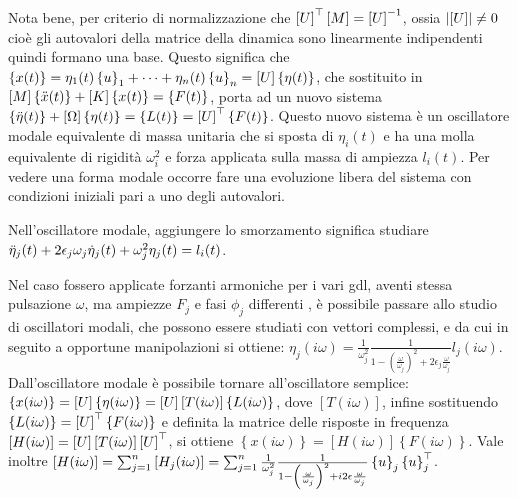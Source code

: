 Nota bene, per criterio di normalizzazione che \(\left[ U \right]^\top \left[M\right] = \left[ U \right]^{-1}\), ossia \(\left|\left[ U \right]\right| \neq 0\) cioè gli autovalori della matrice della dinamica sono linearmente indipendenti quindi formano una base.
Questo significa che \(\left\{ x(t) \right\} = \eta_1(t) \left\{ u \right\}_1 + \dots + \eta_n(t) \left\{ u \right\}_n = \left[ U \right] \left\{ \eta(t) \right\}\), che sostituito in \(\left[M\right] \left\{ \Ddot{x}(t) \right\} + \left[ K \right] \left\{ x(t) \right\} = \left\{ F(t) \right\}\), porta ad un nuovo sistema \(\left\{ \Ddot{\eta}(t) \right\} + \left[ \Omega \right] \left\{ \eta(t) \right\} = \left\{ L(t) \right\} = \left[ U \right]^\top \left\{ F(t) \right\} \).
Questo nuovo sistema è un oscillatore modale equivalente di massa unitaria che si sposta di \(\eta_i(t)\) e ha una molla equivalente di rigidità \(\omega_i^2\) e forza applicata sulla massa di ampiezza \(l_i(t)\).
Per vedere una forma modale occorre fare una evoluzione libera del sistema con condizioni iniziali pari a uno degli autovalori.

Nell'oscillatore modale, aggiungere lo smorzamento significa studiare \( \Ddot{\eta}_j(t) + 2\epsilon_j\omega_j \dot{\eta}_j(t) + \omega^2_j \eta_j(t) = l_i(t) \).

Nel caso fossero applicate forzanti armoniche per i vari gdl, aventi stessa pulsazione \(\omega\), ma ampiezze \(F_j\) e fasi \(\phi_j\) differenti , è possibile passare allo studio di oscillatori modali, che possono essere studiati con vettori complessi, e da cui in seguito a opportune manipolazioni  si ottiene: \(\eta_j(i\omega) = \frac{1}{\omega_j^2} \frac{1}{1-\left(\frac{\omega}{\omega_j}\right)^2 + 2\epsilon_j \frac{\omega}{\omega_j}} l_j(i\omega)\).
Dall'oscillatore modale è possibile tornare all'oscillatore semplice: \(\left\{ x(i\omega) \right\} = \left[ U \right] \left\{ \eta(i\omega) \right\} = \left[ U \right] \left[ T(i\omega) \right] \left\{ L(i\omega) \right\} \), dove \(\left[ T(i\omega) \right]\), infine sostituendo \(\left\{ L(i\omega) \right\} = \left[ U \right]^\top \left\{ F(i\omega) \right\}\) e definita la matrice delle risposte in frequenza \( \left[ H(i\omega) \right] = \left[ U \right] \left[ T(i\omega) \right] \left[ U \right]^\top \), si ottiene \( \left\{ x(i\omega) \right\} = \left[ H(i\omega) \right] \left\{ F(i\omega) \right\} \).
Vale inoltre \(\left[ H(i\omega) \right] = \sum^n_{j=1} \left[ H_j(i\omega) \right] = \sum^n_{j=1} \frac{1}{\omega^2_j} \frac{1}{1-\left(\frac{\omega}{\omega_j}\right)^2 + i2 \epsilon \frac{\omega}{\omega_j}} \left\{ u \right\}_j \left\{ u \right\}_j^\top \).



